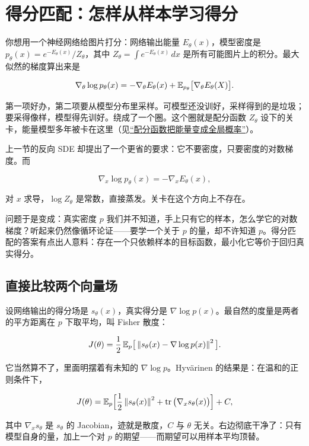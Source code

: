 \section{得分匹配：怎样从样本学习得分}
\label{sec:06-Random-Processes/06-Diffusion-and-SDE/05}

你想用一个神经网络给图片打分：网络输出能量 \(E_\theta(x)\)，模型密度是 \(p_\theta(x)=e^{-E_\theta(x)}/Z_\theta\)，其中 \(Z_\theta=\int e^{-E_\theta(x)}\,dx\) 是所有可能图片上的积分。最大似然的梯度算出来是

\[
\nabla_\theta\log p_\theta(x)=-\nabla_\theta E_\theta(x)+\mathbb{E}_{p_\theta}\big[\nabla_\theta E_\theta(X)\big].
\]

第一项好办，第二项要从模型分布里采样。可模型还没训好，采样得到的是垃圾；要采得像样，模型得先训好。绕成了一个圈。这个圈就是配分函数 \(Z_\theta\) 设下的关卡，能量模型多年被卡在这里（见\hyperref[sec:13-Machine-Learning/08-Sampling-and-Inference/06]{``配分函数把能量变成全局概率''}）。

上一节的反向 SDE 却提出了一个更省的要求：它不要密度，只要密度的对数梯度。而

\[
\nabla_x\log p_\theta(x)=-\nabla_x E_\theta(x),
\]

对 \(x\) 求导，\(\log Z_\theta\) 是常数，直接蒸发。关卡在这个方向上不存在。

问题于是变成：真实密度 \(p\) 我们并不知道，手上只有它的样本，怎么学它的对数梯度？听起来仍然像循环论证——要学一个关于 \(p\) 的量，却不许知道 \(p\)。得分匹配的答案有点出人意料：存在一个只依赖样本的目标函数，最小化它等价于回归真实得分。

\subsection{直接比较两个向量场}

设网络输出的得分场是 \(s_\theta(x)\)，真实得分是 \(\nabla\log p(x)\)。最自然的度量是两者的平方距离在 \(p\) 下取平均，叫 Fisher 散度：

\[
J(\theta)=\frac12\,\mathbb{E}_{p}\big[\left\lVert s_\theta(x)-\nabla\log p(x)\right\rVert^2\big].
\]

它当然算不了，里面明摆着有未知的 \(\nabla\log p\)。Hyvärinen 的结果是：在温和的正则条件下，

\[
J(\theta)=\mathbb{E}_{p}\Big[\frac12\left\lVert s_\theta(x)\right\rVert^2+\operatorname{tr}\big(\nabla_x s_\theta(x)\big)\Big]+C,
\]

其中 \(\nabla_xs_\theta\) 是 \(s_\theta\) 的 Jacobian，迹就是散度，\(C\) 与 \(\theta\) 无关。右边彻底干净了：只有模型自身的量，加上一个对 \(p\) 的期望——而期望可以用样本平均顶替。

